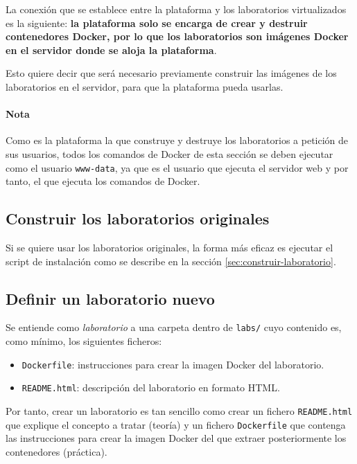         La conexión que se establece entre la plataforma y los laboratorios virtualizados es la siguiente: \textbf{la plataforma solo se encarga de crear y destruir contenedores Docker, por lo que los laboratorios son imágenes Docker en el servidor donde se aloja la plataforma}.

        Esto quiere decir que será necesario previamente construir las imágenes de los laboratorios en el servidor, para que la plataforma pueda usarlas.

        \paragraph{Nota}

            Como es la plataforma la que construye y destruye los laboratorios a petición de sus usuarios, todos los comandos de Docker de esta sección se deben ejecutar como el usuario \texttt{www-data}, ya que es el usuario que ejecuta el servidor web y por tanto, el que ejecuta los comandos de Docker.

        \subsection{Construir los laboratorios originales}

            Si se quiere usar los laboratorios originales, la forma más eficaz es ejecutar el script de instalación como se describe en la sección \ref{sec:construir-laboratorio}.

        \subsection{Definir un laboratorio nuevo}

            Se entiende como \textit{laboratorio} a una carpeta dentro de \texttt{labs/} cuyo contenido es, como mínimo, los siguientes ficheros:
            
            \begin{itemize}
                \item \texttt{Dockerfile}: instrucciones para crear la imagen Docker del laboratorio.
                \item \texttt{README.html}: descripción del laboratorio en formato HTML.
            \end{itemize}

            Por tanto, crear un laboratorio es tan sencillo como crear un fichero \texttt{README.html} que explique el concepto a tratar (teoría) y un fichero \texttt{Dockerfile} que contenga las instrucciones para crear la imagen Docker del que extraer posteriormente los contenedores (práctica).

